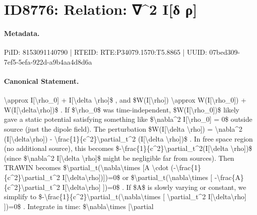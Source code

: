 \section*{ID8776: Relation: ∇\textasciicircum{}2 I[δ ρ]}
\paragraph{Metadata.}
PiID: 8153091140790 | RTEID: RTE:P34079.1570:T5.8865 | UUID: 07bed309-7ef5-5efa-922d-a9b4aa4d8d6a

\paragraph{Canonical Statement.}
\textbackslash{}approx I[\textbackslash{}rho\_0] + I[\textbackslash{}delta \textbackslash{}rho]\$ , and \$W(I[\textbackslash{}rho]) \textbackslash{}approx W(I[\textbackslash{}rho\_0]) + W(I[\textbackslash{}delta\textbackslash{}rho])\$ . If \$\textbackslash{}rho\_0\$ was time-independent, \$W(I[\textbackslash{}rho\_0])\$ likely gave a static potential satisfying something like \$\textbackslash{}nabla\textasciicircum{}2 I[\textbackslash{}rho\_0] = 0\$ outside source (just the dipole field). The perturbation \$W(I[\textbackslash{}delta \textbackslash{}rho]) = \textbackslash{}nabla\textasciicircum{}2 (I[\textbackslash{}delta\textbackslash{}rho]) - \textbackslash{}frac\{1\}\{c\textasciicircum{}2\}\textbackslash{}partial\_t\textasciicircum{}2 (I[\textbackslash{}delta \textbackslash{}rho])\$ . In free space region (no additional source), this becomes \$-\textbackslash{}frac\{1\}\{c\textasciicircum{}2\}\textbackslash{}partial\_t\textasciicircum{}2(I[\textbackslash{}delta \textbackslash{}rho])\$ (since \$\textbackslash{}nabla\textasciicircum{}2 I[\textbackslash{}delta \textbackslash{}rho]\$ might be negligible far from sources). Then TRAWIN becomes \$\textbackslash{}partial\_t(\textbackslash{}nabla\textbackslash{}times [A \textbackslash{}cdot (-\textbackslash{}frac\{1\}\{c\textasciicircum{}2\}\textbackslash{}partial\_t\textasciicircum{}2 I[\textbackslash{}delta\textbackslash{}rho])])=0\$ or \$\textbackslash{}partial\_t(\textbackslash{}nabla\textbackslash{}times [ -\textbackslash{}frac\{A\}\{c\textasciicircum{}2\}\textbackslash{}partial\_t\textasciicircum{}2 I[\textbackslash{}delta\textbackslash{}rho] ])=0\$ . If \$A\$ is slowly varying or constant, we simplify to \$-\textbackslash{}frac\{1\}\{c\textasciicircum{}2\}\textbackslash{}partial\_t(\textbackslash{}nabla\textbackslash{}times [ \textbackslash{}partial\_t\textasciicircum{}2 I[\textbackslash{}delta\textbackslash{}rho] ])=0\$ . Integrate in time: \$\textbackslash{}nabla\textbackslash{}times [\textbackslash{}partial

